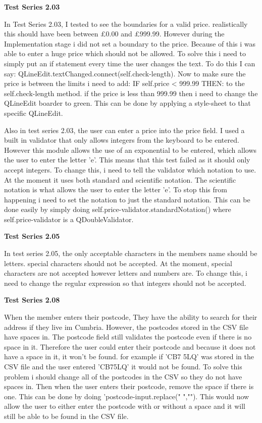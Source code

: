 \textbf{Test Series 2.03}

In Test Series 2.03, I tested to see the boundaries for a valid price. realistically this should have been between £0.00 and £999.99. However during the Implementation stage i did not set a boundary to the price. Because of this i was able to enter a huge price which should not be allowed. To solve this i need to simply put an if statement every time the user changes the text. To do this I can say: QLineEdit.textChanged.connect(self.check-length). Now to make sure the price is between the limits i need to add: IF self.price < 999.99 THEN: to the self.check-length method. if the price is less than 999.99 then i need to change the QLineEdit boarder to green. This can be done by applying a style-sheet to that specific QLineEdit.

Also in test series 2.03, the user can enter a price into the price field. I used a built in validator that only allows integers from the keyboard to be entered. However this module allows the use of an exponential to be entered, which allows the user to enter the letter 'e'. This means that this test failed as it should only accept integers. To change this, i need to tell the validator which notation to use. At the moment it uses both standard and scientific notation. The scientific notation is what allows the user to enter the letter 'e'. To stop this from happening i need to set the notation to just the standard notation. This can be done easily by simply doing self.price-validator.standardNotation() where self.price-validator is a QDoubleValidator.

\textbf{Test Series 2.05}

In test series 2.05, the only acceptable characters in the members name should be letters. special characters should not be accepted. At the moment, special characters are not accepted however letters and numbers are. To change this, i need to change the regular expression so that integers should not be accepted.

\textbf{Test Series 2.08}

When the member enters their postcode, They have the ability to search for their address if they live im Cumbria. However, the postcodes stored in the CSV file have spaces in. The postcode field still validates the postcode even if there is no space in it. Therefore the user could enter their postcode and because it does not have a space in it, it won't be found. for example if 'CB7 5LQ' was stored in the CSV file and the user entered 'CB75LQ' it would not be found. To solve this problem i should change all of the postcodes in the CSV so they do not have spaces in. Then when the user enters their postcode, remove the space if there is one. This can be done by doing 'postcode-input.replace(" ",""). This would now allow the user to either enter the postcode with or without a space and it will still be able to be found in the CSV file.

